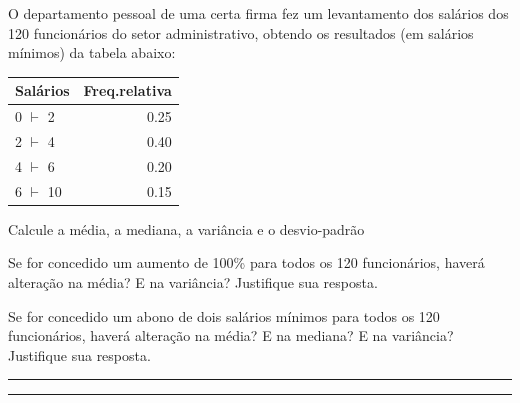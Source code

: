 \documentclass[a4paper,11pt,fleqn]{article}\usepackage[]{graphicx}\usepackage[]{color}
\theoremstyle{definition}
\begin{document}
\begin{compactenum}[8.] %
\item O departamento pessoal de uma certa firma fez um levantamento dos
  salários dos 120 funcionários do setor administrativo, obtendo os
  resultados (em salários mínimos) da tabela abaixo:
\begin{table}[ht]
\centering
\begin{tabular}{lr}
  \hline
Salários & Freq.relativa \\ 
  \hline
0 $\vdash$ 2 & 0.25 \\ 
  2 $\vdash$ 4 & 0.40 \\ 
  4 $\vdash$ 6 & 0.20 \\ 
  6 $\vdash$ 10 & 0.15 \\ 
   \hline
\end{tabular}
\end{table}

\begin{compactenum}
\item Calcule a média, a mediana, a variância e o desvio-padrão

\item Se for concedido um aumento de 100\% para todos os 120
  funcionários, haverá alteração na média? E na variância? Justifique
  sua resposta.

\item Se for concedido um abono de dois salários mínimos para todos os
  120 funcionários, haverá alteração na média? E na mediana? E na
  variância? Justifique sua resposta.

\end{compactenum}
\end{compactenum}

\vspace{0.3cm}
\hrule
\vspace{0.3cm}

\clearpage

\vspace{0.3cm}
\hrule
\vspace{0.3cm}
\end{document}
